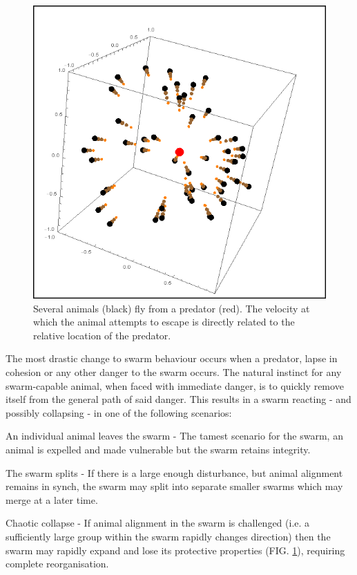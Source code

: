 \documentclass[
reprint,
showpacs,
preprintnumbers,
bibnotes,
amsmath,
amssymb,
aps,
pra,
floatfix,
]{revtex4-1}
\begin{document}
\begin{figure}[!htp]
	\includegraphics[width=0.65\linewidth]{images/predator.png}

	\caption{
		Several animals (black) fly from a predator (red).
		The velocity at which the animal attempts to escape is directly related to the relative location of the predator.
	}

	\label{fig:animalpredator}
\end{figure}

The most drastic change to swarm behaviour occurs when a predator, lapse in cohesion or any other danger to the swarm occurs.
The natural instinct for any swarm-capable animal, when faced with immediate danger, is to quickly remove itself from the general path of said danger.
This results in a swarm reacting - and possibly collapsing - in one of the following scenarios:
\begin{description}
    \item{An individual animal leaves the swarm - The tamest scenario for the swarm, an animal is expelled and made vulnerable but the swarm retains integrity.}
    \item{The swarm splits - If there is a large enough disturbance, but animal alignment remains in synch, the swarm may split into separate smaller swarms which may merge at a later time.}
    \item{Chaotic collapse - If animal alignment in the swarm is challenged (i.e. a sufficiently large group within the swarm rapidly changes direction) then the swarm may rapidly expand and lose its protective properties (FIG. \ref{fig:animalpredator}), requiring complete reorganisation.}
\end{description}
\end{document}
